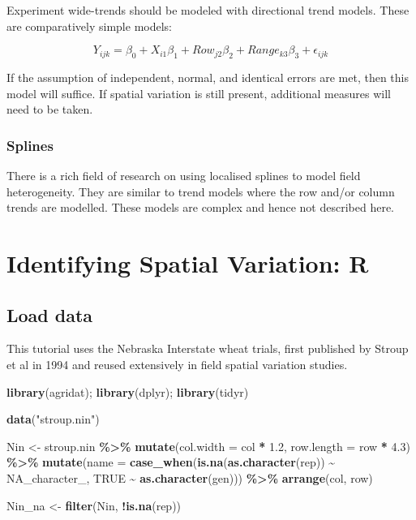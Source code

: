 \documentclass[
]{book}
\newenvironment{Shaded}{\begin{snugshade}}{\end{snugshade}}
\newcommand{\AttributeTok}[1]{\textcolor[rgb]{0.13,0.29,0.53}{#1}}
\newcommand{\ConstantTok}[1]{\textcolor[rgb]{0.56,0.35,0.01}{#1}}
\newcommand{\FloatTok}[1]{\textcolor[rgb]{0.00,0.00,0.81}{#1}}
\newcommand{\FunctionTok}[1]{\textcolor[rgb]{0.13,0.29,0.53}{\textbf{#1}}}
\newcommand{\NormalTok}[1]{#1}
\newcommand{\OtherTok}[1]{\textcolor[rgb]{0.56,0.35,0.01}{#1}}
\newcommand{\SpecialCharTok}[1]{\textcolor[rgb]{0.81,0.36,0.00}{\textbf{#1}}}
\newcommand{\StringTok}[1]{\textcolor[rgb]{0.31,0.60,0.02}{#1}}
\begin{document}
Experiment wide-trends should be modeled with directional trend models. These are comparatively simple models:

\[Y_{ijk} = \beta_0 + X_{i1}\beta_1 +  Row_{j2}\beta_2 + Range_{k3}\beta_3 +\epsilon_{ijk}\]

If the assumption of independent, normal, and identical errors are met, then this model will suffice. If spatial variation is still present, additional measures will need to be taken.

\hypertarget{splines}{%
\subsection{Splines}\label{splines}}

There is a rich field of research on using localised splines to model field heterogeneity. They are similar to trend models where the row and/or column trends are modelled. These models are complex and hence not described here.

\hypertarget{spatial-r}{%
\chapter{Identifying Spatial Variation: R}\label{spatial-r}}

\hypertarget{load-data}{%
\section{Load data}\label{load-data}}

This tutorial uses the Nebraska Interstate wheat trials, first published by Stroup et al in 1994 \citep{stroup1994} and reused extensively in field spatial variation studies.

\begin{Shaded}
\begin{Highlighting}[]
\FunctionTok{library}\NormalTok{(agridat); }\FunctionTok{library}\NormalTok{(dplyr); }\FunctionTok{library}\NormalTok{(tidyr)}

\FunctionTok{data}\NormalTok{(}\StringTok{"stroup.nin"}\NormalTok{)}

\NormalTok{Nin }\OtherTok{\textless{}{-}}\NormalTok{ stroup.nin }\SpecialCharTok{\%\textgreater{}\%} \FunctionTok{mutate}\NormalTok{(}\AttributeTok{col.width =}\NormalTok{ col }\SpecialCharTok{*} \FloatTok{1.2}\NormalTok{, }
                             \AttributeTok{row.length =}\NormalTok{ row }\SpecialCharTok{*} \FloatTok{4.3}\NormalTok{) }\SpecialCharTok{\%\textgreater{}\%} 
  \FunctionTok{mutate}\NormalTok{(}\AttributeTok{name =} \FunctionTok{case\_when}\NormalTok{(}\FunctionTok{is.na}\NormalTok{(}\FunctionTok{as.character}\NormalTok{(rep)) }\SpecialCharTok{\textasciitilde{}} \ConstantTok{NA\_character\_}\NormalTok{, }
                          \ConstantTok{TRUE} \SpecialCharTok{\textasciitilde{}} \FunctionTok{as.character}\NormalTok{(gen))) }\SpecialCharTok{\%\textgreater{}\%} 
  \FunctionTok{arrange}\NormalTok{(col, row)}

\NormalTok{Nin\_na }\OtherTok{\textless{}{-}} \FunctionTok{filter}\NormalTok{(Nin, }\SpecialCharTok{!}\FunctionTok{is.na}\NormalTok{(rep))}
\end{Highlighting}
\end{Shaded}
\end{document}
